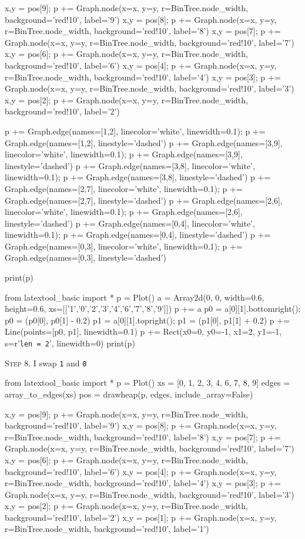 x,y = pos[9]; p += Graph.node(x=x, y=y, r=BinTree.node_width, background='red!10', label='9')
x,y = pos[8]; p += Graph.node(x=x, y=y, r=BinTree.node_width, background='red!10', label='8')
x,y = pos[7]; p += Graph.node(x=x, y=y, r=BinTree.node_width, background='red!10', label='7')
x,y = pos[6]; p += Graph.node(x=x, y=y, r=BinTree.node_width, background='red!10', label='6')
x,y = pos[4]; p += Graph.node(x=x, y=y, r=BinTree.node_width, background='red!10', label='4')
x,y = pos[3]; p += Graph.node(x=x, y=y, r=BinTree.node_width, background='red!10', label='3')
x,y = pos[2]; p += Graph.node(x=x, y=y, r=BinTree.node_width, background='red!10', label='2')

p += Graph.edge(names=[1,2], linecolor='white', linewidth=0.1); p += Graph.edge(names=[1,2], linestyle='dashed')
p += Graph.edge(names=[3,9], linecolor='white', linewidth=0.1); p += Graph.edge(names=[3,9], linestyle='dashed')
p += Graph.edge(names=[3,8], linecolor='white', linewidth=0.1); p += Graph.edge(names=[3,8], linestyle='dashed')
p += Graph.edge(names=[2,7], linecolor='white', linewidth=0.1); p += Graph.edge(names=[2,7], linestyle='dashed')
p += Graph.edge(names=[2,6], linecolor='white', linewidth=0.1); p += Graph.edge(names=[2,6], linestyle='dashed')
p += Graph.edge(names=[0,4], linecolor='white', linewidth=0.1); p += Graph.edge(names=[0,4], linestyle='dashed')
p += Graph.edge(names=[0,3], linecolor='white', linewidth=0.1); p += Graph.edge(names=[0,3], linestyle='dashed')

print(p)

from latextool_basic import *
p = Plot()
a = Array2d(0, 0, width=0.6, height=0.6, 
             xs=[['1','0','2','3','4','6','7','8','9']])
p += a
p0 = a[0][1].bottomright(); p0 = (p0[0], p0[1] - 0.2)
p1 = a[0][1].topright(); p1 = (p1[0], p1[1] + 0.2)
p += Line(points=[p0, p1], linewidth=0.1)
p += Rect(x0=0, y0=-1, x1=2, y1=-1, s=r'\texttt{len = 2}', linewidth=0) 
print(p)


\textsc{Step 8}.
I swap \texttt{1} and \texttt{0}


from latextool_basic import *
p = Plot()
xs = [0, 1, 2, 3, 4, 6, 7, 8, 9]
edges = array_to_edges(xs)
pos = drawheap(p, edges, include_array=False)

x,y = pos[9]; p += Graph.node(x=x, y=y, r=BinTree.node_width, background='red!10', label='9')
x,y = pos[8]; p += Graph.node(x=x, y=y, r=BinTree.node_width, background='red!10', label='8')
x,y = pos[7]; p += Graph.node(x=x, y=y, r=BinTree.node_width, background='red!10', label='7')
x,y = pos[6]; p += Graph.node(x=x, y=y, r=BinTree.node_width, background='red!10', label='6')
x,y = pos[4]; p += Graph.node(x=x, y=y, r=BinTree.node_width, background='red!10', label='4')
x,y = pos[3]; p += Graph.node(x=x, y=y, r=BinTree.node_width, background='red!10', label='3')
x,y = pos[2]; p += Graph.node(x=x, y=y, r=BinTree.node_width, background='red!10', label='2')
x,y = pos[1]; p += Graph.node(x=x, y=y, r=BinTree.node_width, background='red!10', label='1')

